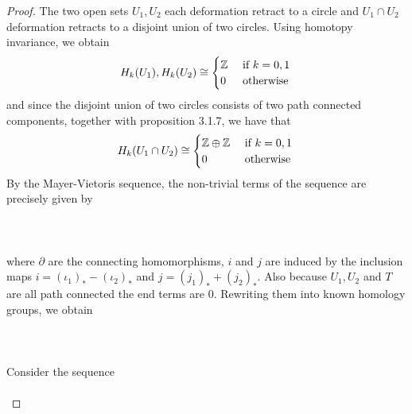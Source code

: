 \documentclass[a4paper]{article}
\begin{document}
\begin{thm}{}{}
\begin{proof}
The two open sets $U_1,U_2$ each deformation retract to a circle and $U_1\cap U_2$ deformation retracts to a disjoint union of two circles. Using homotopy invariance, we obtain $$H_k(U_1),H_k(U_2)\cong\begin{cases}
\mathbb{Z} & \text{ if } k=0,1\\
0 & \text{ otherwise }
\end{cases}$$ and since the disjoint union of two circles consists of two path connected components, together with proposition 3.1.7, we have that $$H_k(U_1\cap U_2)\cong\begin{cases}
\mathbb{Z}\oplus\mathbb{Z} & \text{ if } k=0,1\\
0 & \text{ otherwise }
\end{cases}$$
By the Mayer-Vietoris sequence, the non-trivial terms of the sequence are precisely given by \\~\\
\\~\\
where $\partial$ are the connecting homomorphisms, $i$ and $j$ are induced by the inclusion maps $i=(\iota_1)_\ast-(\iota_2)_\ast$ and $j=(j_1)_\ast+(j_2)_\ast$. Also because $U_1,U_2$ and $T$ are all path connected the end terms are $0$. Rewriting them into known homology groups, we obtain \\~\\
\\~\\
Consider the sequence \\~\\
\end{proof}
\end{thm}
\end{document}
